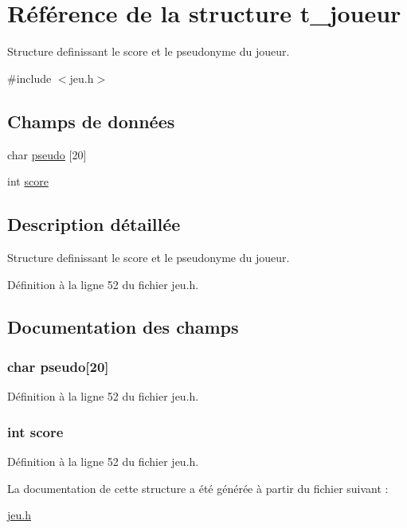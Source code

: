 \hypertarget{structt__joueur}{\section{\-Référence de la structure t\-\_\-joueur}
\label{structt__joueur}
}


\-Structure definissant le score et le pseudonyme du joueur.  




{\ttfamily \#include $<$jeu.\-h$>$}

\subsection*{\-Champs de données}
\begin{DoxyCompactItemize}
\item 
char \hyperlink{structt__joueur_a93f1b6ce36b864a94ee296223bf15432}{pseudo} \mbox{[}20\mbox{]}
\item 
int \hyperlink{structt__joueur_aef160b7437d94056f1dc59646cd5b87d}{score}
\end{DoxyCompactItemize}


\subsection{\-Description détaillée}
\-Structure definissant le score et le pseudonyme du joueur. 

\-Définition à la ligne 52 du fichier jeu.\-h.



\subsection{\-Documentation des champs}
\hypertarget{structt__joueur_a93f1b6ce36b864a94ee296223bf15432}{
\subsubsection[{pseudo}]{\setlength{\rightskip}{0pt plus 5cm}char {\bf pseudo}\mbox{[}20\mbox{]}}}\label{structt__joueur_a93f1b6ce36b864a94ee296223bf15432}


\-Définition à la ligne 52 du fichier jeu.\-h.

\hypertarget{structt__joueur_aef160b7437d94056f1dc59646cd5b87d}{
\subsubsection[{score}]{\setlength{\rightskip}{0pt plus 5cm}int {\bf score}}}\label{structt__joueur_aef160b7437d94056f1dc59646cd5b87d}


\-Définition à la ligne 52 du fichier jeu.\-h.



\-La documentation de cette structure a été générée à partir du fichier suivant \-:\begin{DoxyCompactItemize}
\item 
\hyperlink{jeu_8h}{jeu.\-h}\end{DoxyCompactItemize}
